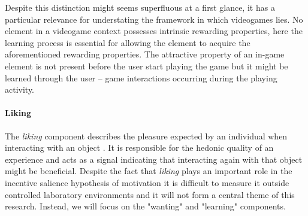 Despite this distinction might seems superfluous at a first glance, it has a particular relevance for understating the framework in which videogames lies. No element in a videogame context possesses intrinsic rewarding properties, here the learning process is essential for allowing the element to acquire the aforementioned rewarding properties. The attractive property of an in-game element is not present before the user start playing the game but it might be learned through the user – game interactions occurring during the playing activity.

\paragraph{Liking}
\label{liking}
The \emph{liking} component describes the pleasure expected by an individual when interacting with an object \cite{berridge2009dissecting}. It is responsible for the hedonic quality of an experience and acts as a signal indicating that interacting again with that object might be beneficial. Despite the fact that \emph{liking} plays an important role in the incentive salience hypothesis of motivation it is difficult to measure it outside controlled laboratory environments \cite{berridge1998role} and it will not form a central theme of this research. Instead, we will focus on the "wanting" and "learning" components.

